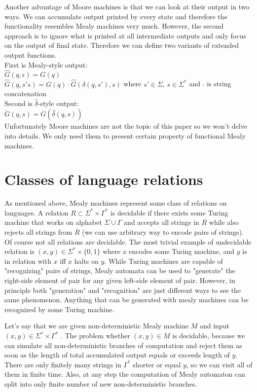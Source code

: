 \documentclass[12pt]{article}
\begin{document}
Another advantage of Moore machines is that we can look at their output in two ways. We can accumulate output printed by every state and therefore the functionality resembles Mealy machines very much. However, the second approach is to ignore what is printed at all intermediate outputs and only focus on the output of final state. Therefore we can define two variants of extended output functions. \\
First is Mealy-style output: \\
$\hat{G}(q,\epsilon) = G(q)$ \\
$\hat{G}(q,s's) = G(q)\cdot\hat{G}(\delta(q,s'),s)$ where $s' \in \Sigma$, $s\in\Sigma^*$ and $\cdot$ is string concatenation \\
Second is $\hat{\delta}$-style output: \\
$\check{G}(q,s) = G(\hat{\delta}(q,s))$\\


Unfortunately Moore machines are not the topic of this paper so we won't delve  into details. We only need them to present certain property of functional Mealy machines. 


\section{Classes of language relations} As mentioned above, Mealy machines represent some class of relations on languages. A relation $R \subset \Sigma^* \times \Gamma^*$ is decidable if there exists some Turing machine that works on alphabet $\Sigma \cup \Gamma$ and accepts all strings in $R$ while also rejects all strings from $\overline{R}$ (we can use arbitrary way to encode pairs of strings). Of course not all relations are decidable. The most trivial example of undecidable relation is $(x,y)  \in \Sigma^* \times \{0,1\}$ where  $x$ encodes some Turing machine, and $y$ is in relation with $x$ iff $x$ halts on $y$. While Turing machines are capable of "recognizing" pairs of strings, Mealy automata can be used to "generate" the right-side element of pair for any given left-side element of pair. However, in principle both "generation" and "recognition" are just different ways to see the same phenomenon. Anything that can be generated with mealy machines can be recognized by some Turing machine. 

Let's say that we are given non-deterministic Mealy machine $M$ and input $(x,y) \in \Sigma^* \times \Gamma^*$ . The problem whether $(x,y) \in M$ is decidable, because we can simulate all non-deterministic branches of computation and reject them as soon as the length of total accumulated output equals or exceeds length of $y$. There are only finitely many strings in $\Gamma^*$ shorter or equal $y$, so we can visit all of them in finite time. Also, at any step the computation of Mealy automaton can split into only finite number of new non-deterministic branches. 
\end{document}

